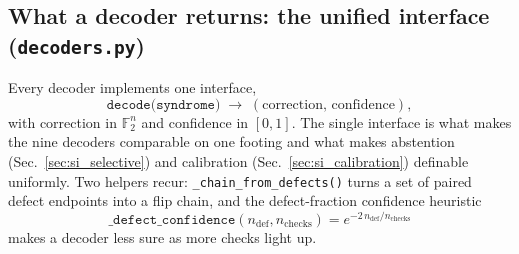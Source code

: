 \documentclass[reprint,aps,prxquantum,amsmath,amssymb,floatfix,nofootinbib,longbibliography]{revtex4-2}
\theoremstyle{definition}
\theoremstyle{remark}
\theoremstyle{plain}
\newcommand{\F}{\mathbb{F}}
\begin{document}
\subsection{What a decoder returns: the unified interface (\texttt{decoders.py})}
\label{sec:si_interface}
Every decoder implements one interface,
\begin{equation}
  \texttt{decode(syndrome)} \;\longrightarrow\; (\text{correction},\,\text{confidence}),
\end{equation}
with correction in $\F_2^n$ and confidence in $[0,1]$. The single interface is what makes the nine decoders comparable on one footing and what makes abstention (Sec.~\ref{sec:si_selective}) and calibration (Sec.~\ref{sec:si_calibration}) definable uniformly. Two helpers recur: \texttt{\_chain\_from\_defects()} turns a set of paired defect endpoints into a flip chain, and the defect-fraction confidence heuristic
\begin{equation}
  \texttt{\_defect\_confidence}(n_{\mathrm{def}},n_{\mathrm{checks}})
    = e^{-2\,n_{\mathrm{def}}/n_{\mathrm{checks}}}
\end{equation}
makes a decoder less sure as more checks light up.
\end{document}
